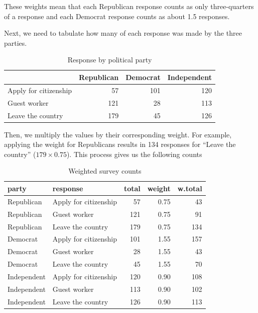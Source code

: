 \documentclass[
]{book}
\begin{document}
These weights mean that each Republican response counts as only three-quarters of a response and each Democrat response counts as about 1.5 responses.

Next, we need to tabulate how many of each response was made by the three parties.

\begin{table}

\caption{\label{tab:unnamed-chunk-272}Response by political party}
\centering
\begin{tabular}[t]{l|r|r|r}
\hline
  & Republican & Democrat & Independent\\
\hline
Apply for citizenship & 57 & 101 & 120\\
\hline
Guest worker & 121 & 28 & 113\\
\hline
Leave the country & 179 & 45 & 126\\
\hline
\end{tabular}
\end{table}

Then, we multiply the values by their corresponding weight. For example, applying the weight for Republicans results in 134 responses for ``Leave the country'' (\(179 \times 0.75\)). This process gives us the following counts

\begin{table}

\caption{\label{tab:unnamed-chunk-274}Weighted survey counts}
\centering
\begin{tabular}[t]{l|l|r|r|r}
\hline
party & response & total & weight & w.total\\
\hline
Republican & Apply for citizenship & 57 & 0.75 & 43\\
\hline
Republican & Guest worker & 121 & 0.75 & 91\\
\hline
Republican & Leave the country & 179 & 0.75 & 134\\
\hline
Democrat & Apply for citizenship & 101 & 1.55 & 157\\
\hline
Democrat & Guest worker & 28 & 1.55 & 43\\
\hline
Democrat & Leave the country & 45 & 1.55 & 70\\
\hline
Independent & Apply for citizenship & 120 & 0.90 & 108\\
\hline
Independent & Guest worker & 113 & 0.90 & 102\\
\hline
Independent & Leave the country & 126 & 0.90 & 113\\
\hline
\end{tabular}
\end{table}
\end{document}
